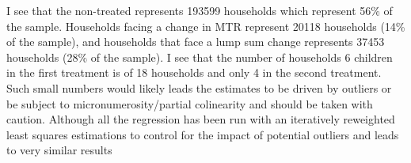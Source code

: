           
         
         
        
         
              






I see that the non-treated represents 193599 households which represent 56\% of the sample. Households facing a change in MTR represent 20118 households (14\% of the sample), and households that face a lump sum change represents 37453 households (28\% of the sample). I see that the number of households 6 children in the first treatment is of 18 households and only 4  in the second treatment. Such small numbers would likely leads the estimates to be driven by outliers or be subject to micronumerosity/partial colinearity and should be taken with caution.  Although all the regression has been run with an iteratively reweighted least squares estimations to control for the impact of potential outliers and leads to very similar results



  
  
  
  
